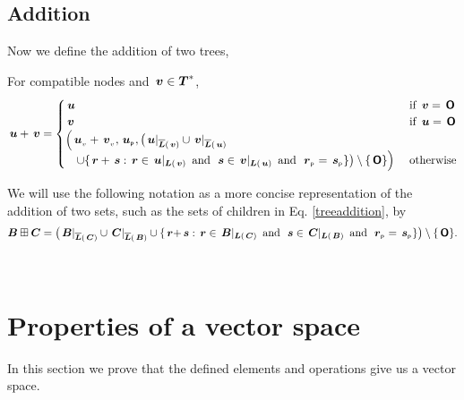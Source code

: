 \subsection{Addition}
Now we define the addition of two trees,
\begin{definition}\label{treeaddition}
  For compatible nodes  and \(\node{v} \in \DOMstar\), 
  \begin{align}
      \node{u} + \node{v} = \begin{cases}
        \node{u} &\text{ if } \node{v} = \zerotree\notag\\
        \node{v} &\text{ if } \node{u} = \zerotree\notag\\
        \Bigl(\nv{u} + \nv{v}, \nlabel{u}, 
        \bigl(\nrestrictedto{u}{v}\cup\nrestrictedto{v}{u} & {} \\
        \quad\cup\{\node{r}+\node{s}:\node{r}\in\restrictedto{u}{v}\mand\node{s}\in\restrictedto{v}{u}\mand\nlabel{r}=\nlabel{s}\}\bigr)\setminus \{\zerotree\}\Bigr) & \text{ otherwise}
      \end{cases}
  \end{align}
\end{definition}

\begin{definition}[Notation]
  We will use the following notation as a more concise representation
  of the addition of two sets, such as the sets of children in
  Eq. \ref{treeaddition}, by
  \begin{align*}
      \set{B}\stplus\set{C} = \childO{B}{C}{r}{s}{+}.
  \end{align*}
\end{definition}
\


\section{Properties of a vector space}
In this section we prove that the defined elements and operations give
us a vector space.  

